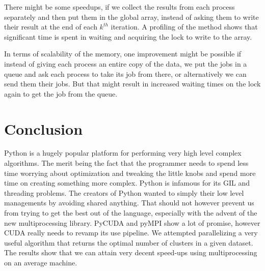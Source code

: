 \documentclass[10pt,twocolumn,letterpaper]{article}
\begin{document}
There might be some speedups, if we collect the results from each
process separately and then put them in the global array, instead
of asking them to write their result at the end of each $k^{th}$ iteration.
A profiling of the method shows that significant time is spent in
waiting and acquiring the lock to write to the array.

In terms of scalability of the memory, one improvement might be possible
if instead of giving each process an entire copy of the data, we put
the jobs in a queue and ask each process to take its job from there,
or alternatively we can send them their jobs. But that might result
in increased waiting times on the lock again to get the job from the
queue.


\section{Conclusion} \label{conclusion}

Python is a hugely popular platform for performing very high level
complex algorithms. The merit being the fact that the programmer needs
to spend less time worrying about optimization and tweaking the little
knobs and spend more time on creating something more complex. Python
is infamous for its GIL and threading problems. The creators of Python
wanted to simply their low level managements by avoiding shared anything.
That should not however prevent us from trying to get the best out
of the language, especially with the advent of the new multiprocessing
library. PyCUDA and pyMPI show a lot of promise, however CUDA really
needs to revamp its use pipeline. We attempted parallelizing a very
useful algorithm that returns the optimal number of clusters in a
given dataset. The results show that we can attain very decent speed-ups using multiprocessing on an average machine.

{\small


}
\end{document}
